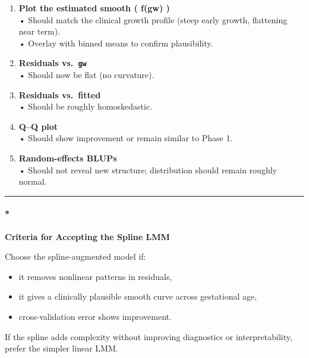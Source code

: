 \documentclass[
  letterpaper,
  DIV=11,
  numbers=noendperiod]{scrreprt}
\let\oldparagraph\paragraph
\renewcommand{\paragraph}[1]{\oldparagraph{#1}\mbox{}}
\providecommand{\tightlist}{%
  \setlength{\itemsep}{0pt}\setlength{\parskip}{0pt}}\usepackage{longtable,booktabs,array}
\begin{document}
\begin{tcolorbox}
\begin{enumerate}
\def\labelenumi{\arabic{enumi}.}
\item
  \textbf{Plot the estimated smooth ( f(gw) )}\\
  • Should match the clinical growth profile (steep early growth,
  flattening near term).\\
  • Overlay with binned means to confirm plausibility.
\item
  \textbf{Residuals vs.~\texttt{gw}}\\
  • Should now be flat (no curvature).
\item
  \textbf{Residuals vs.~fitted}\\
  • Should be roughly homoskedastic.
\item
  \textbf{Q--Q plot}\\
  • Should show improvement or remain similar to Phase 1.
\item
  \textbf{Random-effects BLUPs}\\
  • Should not reveal new structure; distribution should remain roughly
  normal.
\end{enumerate}

\begin{center}\rule{0.5\linewidth}{0.5pt}\end{center}

\hypertarget{criteria-for-accepting-the-spline-lmm}{%
\paragraph*{\texorpdfstring{\textbf{Criteria for Accepting the Spline
LMM}}{Criteria for Accepting the Spline LMM}}\label{criteria-for-accepting-the-spline-lmm}}

Choose the spline-augmented model if:

\begin{itemize}
\tightlist
\item
  it removes nonlinear patterns in residuals,\\
\item
  it gives a clinically plausible smooth curve across gestational age,\\
\item
  cross-validation error shows improvement.
\end{itemize}

If the spline adds complexity without improving diagnostics or
interpretability, prefer the simpler linear LMM.

\end{tcolorbox}
\end{document}
